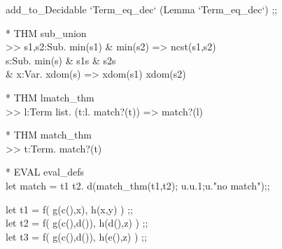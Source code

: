 \begin{prl*}
\>  add\_to\_Decidable `Term\_eq\_dec` (Lemma `Term\_eq\_dec`) ;;
\end{prl*}

\begin{prl*}
\>* THM sub\_union\\
\>  >> \mforall{}s1,s2:Sub. min(s1) \& min(s2) => ncst(s1,s2) \mvee{} \\
\>    \mexists{}s:Sub. min(s) \& s1\msubset{}s \& s2\msubset{}s\\
\>            \& \mforall{}x:Var. x\mepsilon{}dom(s) => x\mepsilon{}dom(s1) \mvee{} x\mepsilon{}dom(s2)
\end{prl*}

\begin{prl*}
\>* THM lmatch\_thm\\
\>  >> \mforall{}l:Term list. (\mforall{}t:l. match?(t)) => match?(l)
\end{prl*}

\begin{prl*}
\>* THM match\_thm\\
\>  >> \mforall{}t:Term. match?(t)
\end{prl*}

\begin{prl*}
\>* EVAL eval\_defs\\
\>  let match = \mlambda{} t1 t2. d(match\_thm(t1,t2); u.u.1;u."no match");;
\end{prl*}

\begin{prl*}
\>  let t1 = f( g(c(),x), h(x,y) ) ;;\\
\>  let t2 = f( g(c(),d()), h(d(),z) ) ;;\\
\>  let t3 = f( g(c(),d()), h(e(),z) ) ;;
\end{prl*}


